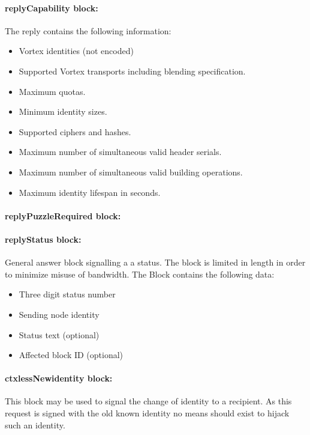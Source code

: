 \paragraph{replyCapability block:}
The reply contains the following information:
\begin{itemize}
	\item Vortex identities (not encoded)
	\item Supported Vortex transports including blending specification.
	\item Maximum quotas.
	\item Minimum identity sizes.
	\item Supported ciphers and hashes.
	\item Maximum number of simultaneous valid header serials.
	\item Maximum number of simultaneous valid building operations.
	\item Maximum identity lifespan in seconds.
\end{itemize}

\paragraph{replyPuzzleRequired block:}


\paragraph{replyStatus block:}
General answer block signalling a a status. The block is limited in length in order to minimize misuse of bandwidth. The Block contains the following data:
\begin{itemize}
	\item Three digit status number
	\item Sending node identity
	\item Status text (optional)
	\item Affected block ID (optional)
\end{itemize}

\paragraph{ctxlessNewidentity block:}
This block may be used to signal the change of identity to a recipient. As this request is signed with the old known identity no means should exist to hijack such an identity.

